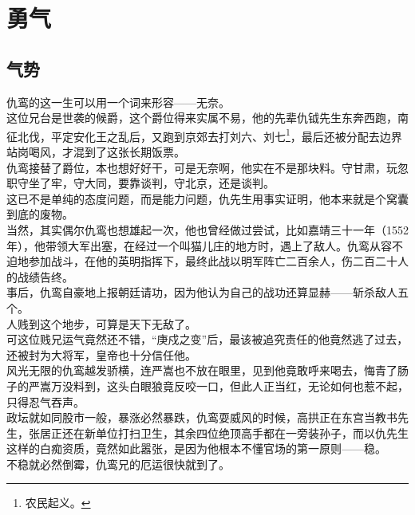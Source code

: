 \section{勇气}
\ifnum{}
	\begin{multicols}{\theparacolNo}
\fi
\subsection{气势}
仇鸾的这一生可以用一个词来形容——无奈。\\

这位兄台是世袭的候爵，这个爵位得来实属不易，他的先辈仇钺先生东奔西跑，南征北伐，平定安化王之乱后，又跑到京郊去打刘六、刘七\footnote{农民起义。}，最后还被分配去边界站岗喝风，才混到了这张长期饭票。\\

仇鸾接替了爵位，本也想好好干，可是无奈啊，他实在不是那块料。守甘肃，玩忽职守坐了牢，守大同，要靠谈判，守北京，还是谈判。\\

这已不是单纯的态度问题，而是能力问题，仇先生用事实证明，他本来就是个窝囊到底的废物。\\

当然，其实偶尔仇鸾也想雄起一次，他也曾经做过尝试，比如嘉靖三十一年（1552年），他带领大军出塞，在经过一个叫猫儿庄的地方时，遇上了敌人。仇鸾从容不迫地参加战斗，在他的英明指挥下，最终此战以明军阵亡二百余人，伤二百二十人的战绩告终。\\

事后，仇鸾自豪地上报朝廷请功，因为他认为自己的战功还算显赫——斩杀敌人五个。\\

人贱到这个地步，可算是天下无敌了。\\

可这位贱兄运气竟然还不错，“庚戍之变”后，最该被追究责任的他竟然逃了过去，还被封为大将军，皇帝也十分信任他。\\

风光无限的仇鸾越发骄横，连严嵩也不放在眼里，见到他竟敢呼来喝去，悔青了肠子的严嵩万没料到，这头白眼狼竟反咬一口，但此人正当红，无论如何也惹不起，只得忍气吞声。\\

政坛就如同股市一般，暴涨必然暴跌，仇鸾耍威风的时候，高拱正在东宫当教书先生，张居正还在新单位打扫卫生，其余四位绝顶高手都在一旁装孙子，而以仇先生这样的白痴资质，竟然如此嚣张，是因为他根本不懂官场的第一原则——稳。\\

不稳就必然倒霉，仇鸾兄的厄运很快就到了。\\


\end{multicols}
